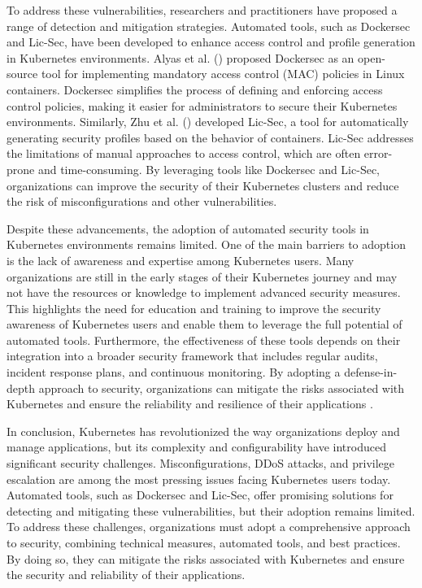 To address these vulnerabilities, researchers and practitioners have proposed a range of detection and mitigation strategies. Automated tools, such as Dockersec and Lic-Sec, have been developed to enhance access control and profile generation in Kubernetes environments. Alyas et al. (\citeyear{alyas2022}) proposed Dockersec as an open-source tool for implementing mandatory access control (MAC) policies in Linux containers. Dockersec simplifies the process of defining and enforcing access control policies, making it easier for administrators to secure their Kubernetes environments. Similarly, Zhu et al. (\citeyear{zhu2023}) developed Lic-Sec, a tool for automatically generating security profiles based on the behavior of containers. Lic-Sec addresses the limitations of manual approaches to access control, which are often error-prone and time-consuming. By leveraging tools like Dockersec and Lic-Sec, organizations can improve the security of their Kubernetes clusters and reduce the risk of misconfigurations and other vulnerabilities.

Despite these advancements, the adoption of automated security tools in Kubernetes environments remains limited. One of the main barriers to adoption is the lack of awareness and expertise among Kubernetes users. Many organizations are still in the early stages of their Kubernetes journey and may not have the resources or knowledge to implement advanced security measures. This highlights the need for education and training to improve the security awareness of Kubernetes users and enable them to leverage the full potential of automated tools. Furthermore, the effectiveness of these tools depends on their integration into a broader security framework that includes regular audits, incident response plans, and continuous monitoring. By adopting a defense-in-depth approach to security, organizations can mitigate the risks associated with Kubernetes and ensure the reliability and resilience of their applications \citep{alyas2022, zhu2023}.

In conclusion, Kubernetes has revolutionized the way organizations deploy and manage applications, but its complexity and configurability have introduced significant security challenges. Misconfigurations, DDoS attacks, and privilege escalation are among the most pressing issues facing Kubernetes users today. Automated tools, such as Dockersec and Lic-Sec, offer promising solutions for detecting and mitigating these vulnerabilities, but their adoption remains limited. To address these challenges, organizations must adopt a comprehensive approach to security, combining technical measures, automated tools, and best practices. By doing so, they can mitigate the risks associated with Kubernetes and ensure the security and reliability of their applications.

